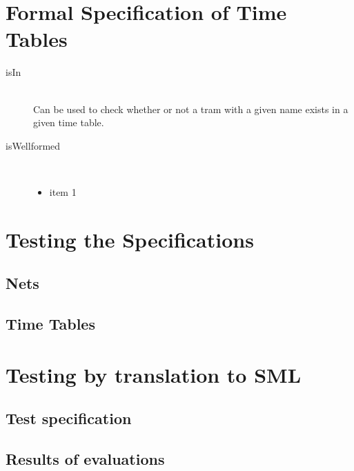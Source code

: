 \documentclass[a4]{article}
\begin{document}
\section{Formal Specification of Time Tables}



\begin{description}
    \item[isIn] \hfill \\ Can be used to check whether or not a tram with a given name exists in a given time table.
    \item[isWellformed] \hfill \\ 
        \begin{itemize}
            \item item 1
        \end{itemize}
\end{description}

\section{Testing the Specifications}

\subsection{Nets}

%

\subsection{Time Tables}

%

\section{Testing by translation to SML}

\subsection{Test specification}

\subsection{Results of evaluations}
\end{document}
